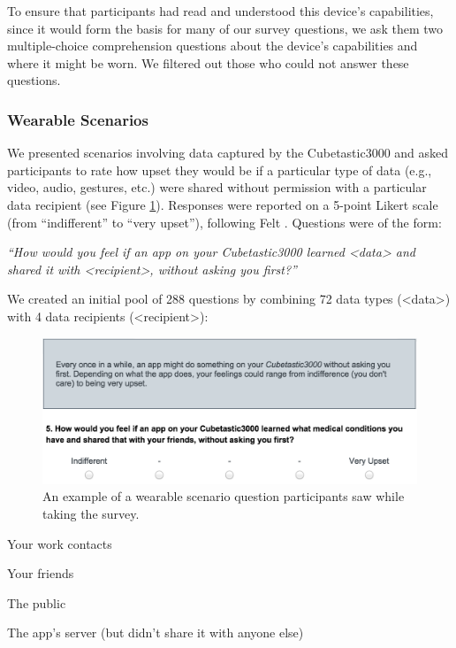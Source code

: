 To ensure that participants had read and understood this device's capabilities, since it would form the basis for many of our survey questions, we ask them two multiple-choice comprehension questions about the device's capabilities and where it might be worn. We filtered out those who could not answer these questions.

\subsubsection{Wearable Scenarios}
We presented scenarios involving data captured by the Cubetastic3000 and asked participants to rate how upset they would be if a particular type of data (e.g., video, audio, gestures, etc.) were shared without permission with a particular data recipient (see Figure \ref{fig:prompt}). Responses were reported on a 5-point Likert scale (from ``indifferent'' to ``very upset''), following Felt \etal\cite{Felt}. Questions were of the form: 

\textit{``How would you feel if an app on your Cubetastic3000 learned <data> and shared it with <recipient>, without asking you first?''}

We created an initial pool of 288 questions by combining 72 data types (<data>) with 4 data recipients (<recipient>): \\[-.8cm]

\begin{figure}[t]
	\centering
	\includegraphics[width=\columnwidth]{images/prompt.pdf}
	\caption{An example of a wearable scenario question participants saw while taking the survey.}
	\label{fig:prompt}
\end{figure}

\begin{packed_item}
\item Your work contacts
\item Your friends
\item The public
\item The app's server (but didn't share it with anyone else)\\[-.8cm]
\end{packed_item}

